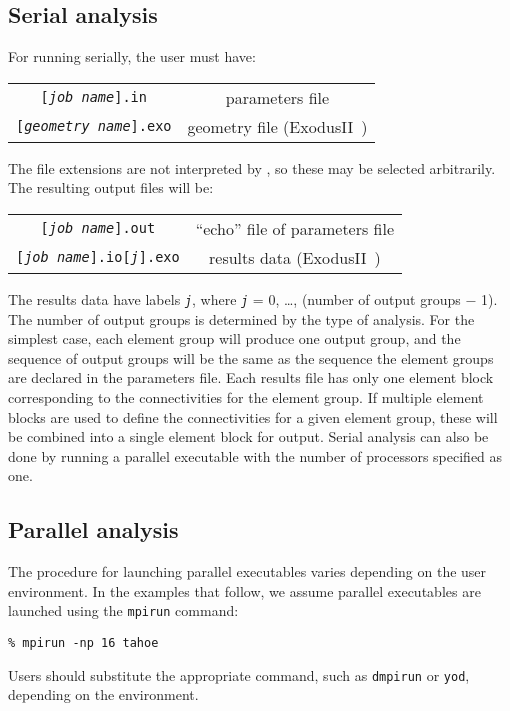 \subsection{Serial analysis}
\label{sect.serial.analysis}
For running serially, the user must have:
\begin{center}
\begin{tabular}[c]{c c}
\parbox[b]{3.0in}{\raggedleft \texttt{[\textsl{job name}].in}} 
&\parbox[b]{3.0in}{parameters file}\\
\parbox[b]{3.0in}{\raggedleft \texttt{[\textsl{geometry name}].exo}} 
&\parbox[b]{3.0in}{geometry file (\textsf{ExodusII}~\cite{exodusII})}\\
\end{tabular}
\end{center}
The file extensions are not interpreted by \tahoe, so these may be selected
arbitrarily.  The resulting output files will be:
\begin{center}
\begin{tabular}[c]{c c}
 \parbox[b]{3.0in}{\raggedleft \texttt{[\textsl{job name}].out}} 
&\parbox[b]{3.0in}{``echo'' file of parameters file}\\
 \parbox[b]{3.0in}{\raggedleft \texttt{[\textsl{job name}].io[\textsl{j}].exo}} 
&\parbox[b]{3.0in}{results data (\textsf{ExodusII}~\cite{exodusII})}\\
\end{tabular}
\end{center}
The results data have labels \texttt{\textsl{j}}, 
where \texttt{\textsl{j}} = 0, \ldots, (number of output groups $-$ 1).  
The number of output groups is determined by the type of analysis. 
For the simplest case, each element group will produce one output group,
and the sequence of output groups will be the same as the sequence the
element groups are declared in the parameters file.  Each results file has
only one element block corresponding to the connectivities for the element
group.  If multiple element blocks are used to define the connectivities
for a given element group, these will be combined into a single element
block for output.  Serial analysis can also be done by running a parallel
executable with the number of processors specified as one.

\subsection{Parallel analysis}
\label{sect.parallel.analysis}
The procedure for launching parallel executables varies depending on the
user environment.  In the examples that follow, we assume parallel
executables are launched using the \texttt{mpirun} command:
\begin{center}
	\texttt{\% mpirun -np 16 tahoe}
\end{center}
Users should substitute the appropriate command, such as \texttt{dmpirun} 
or \texttt{yod}, depending on the environment.

